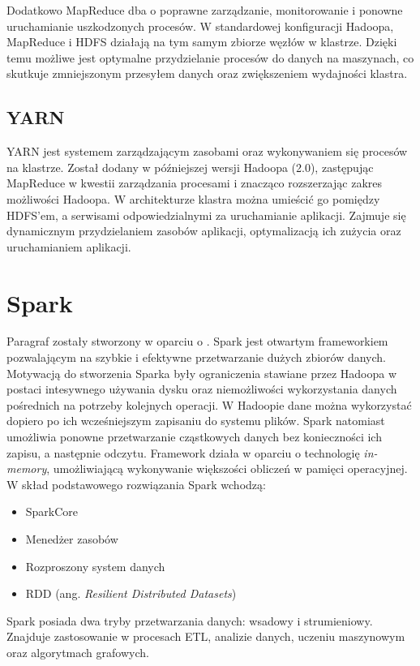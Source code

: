 \documentclass{pracamgr}
\begin{document}
Dodatkowo MapReduce dba o poprawne zarządzanie, monitorowanie i ponowne uruchamianie uszkodzonych procesów. W standardowej konfiguracji Hadoopa, MapReduce i HDFS działają na tym samym zbiorze węzłów w klastrze. Dzięki temu możliwe jest optymalne przydzielanie procesów do danych na maszynach, co skutkuje zmniejszonym przesyłem danych oraz zwiększeniem wydajności klastra.

\subsection{YARN}

YARN jest systemem zarządzającym zasobami oraz wykonywaniem się procesów na klastrze. Został dodany w późniejszej wersji Hadoopa (2.0), zastępując MapReduce w kwestii zarządzania procesami i znacząco rozszerzając zakres możliwości Hadoopa. W architekturze klastra można umieścić go pomiędzy HDFS'em, a serwisami odpowiedzialnymi za uruchamianie aplikacji. Zajmuje się dynamicznym przydzielaniem zasobów aplikacji, optymalizacją ich zużycia oraz uruchamianiem aplikacji.

\section{Spark}

Paragraf zostały stworzony w oparciu o \cite{zaharia2010spark}. Spark jest otwartym frameworkiem pozwalającym na szybkie i efektywne przetwarzanie dużych zbiorów danych. Motywacją do stworzenia Sparka były ograniczenia stawiane przez Hadoopa w postaci intesywnego używania dysku oraz niemożliwości wykorzystania danych pośrednich na potrzeby kolejnych operacji. W Hadoopie dane można wykorzystać dopiero po ich wcześniejszym zapisaniu do systemu plików. Spark natomiast umożliwia ponowne przetwarzanie cząstkowych danych bez konieczności ich zapisu, a następnie odczytu. Framework działa w oparciu o technologię \textit{in-memory}, umożliwiającą wykonywanie większości obliczeń w pamięci operacyjnej. W skład podstawowego rozwiązania Spark wchodzą:
\begin{itemize}
    \item SparkCore
    \item Menedżer zasobów
    \item Rozproszony system danych
    \item RDD (ang. \textit{Resilient Distributed Datasets})
\end{itemize}

Spark posiada dwa tryby przetwarzania danych: wsadowy i strumieniowy. Znajduje zastosowanie w procesach ETL, analizie danych, uczeniu maszynowym oraz algorytmach grafowych.
\end{document}
